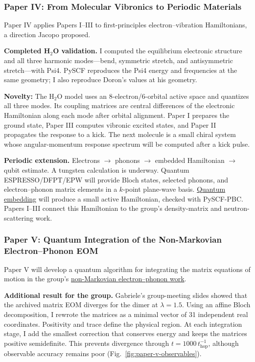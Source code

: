 \documentclass[11pt]{article}
\begin{document}
\subsubsection*{Paper IV: From Molecular Vibronics to Periodic Materials}
Paper IV applies Papers I--III to first-principles electron--vibration Hamiltonians, a direction Jacopo proposed.

\textbf{Completed H$_2$O validation.} I computed the equilibrium electronic structure and all three harmonic modes---bend, symmetric stretch, and antisymmetric stretch---with Psi4. PySCF reproduces the Psi4 energy and frequencies at the same geometry; I also reproduce Doron's values at his geometry.

\textbf{Novelty:} The H$_2$O model uses an 8-electron/6-orbital active space and quantizes all three modes. Its coupling matrices are central differences of the electronic Hamiltonian along each mode after orbital alignment. Paper I prepares the ground state, Paper III computes vibronic excited states, and Paper II propagates the response to a kick. The next molecule is a small chiral system whose angular-momentum response spectrum will be computed after a kick pulse.

\textbf{Periodic extension.} Electrons \(\rightarrow\) phonons \(\rightarrow\) embedded Hamiltonian \(\rightarrow\) qubit estimate. A tungsten calculation is underway. Quantum ESPRESSO/DFPT/EPW will provide Bloch states, selected phonons, and electron--phonon matrix elements in a \(k\)-point plane-wave basis. \href{https://doi.org/10.1038/s41524-020-00353-z}{Quantum embedding} will produce a small active Hamiltonian, checked with PySCF-PBC. Papers I--III connect this Hamiltonian to the group's density-matrix and neutron-scattering work.

\clearpage
\subsubsection*{Paper V: Quantum Integration of the Non-Markovian Electron--Phonon EOM}
Paper V will develop a quantum algorithm for integrating the matrix equations of motion in the group's \href{https://arxiv.org/abs/2606.22233}{non-Markovian electron--phonon work}.

\textbf{Additional result for the group.} Gabriele's group-meeting slides showed that the archived matrix EOM diverges for the dimer at \(\lambda=1.5\). Using an affine Bloch decomposition, I rewrote the matrices as a minimal vector of 31 independent real coordinates. Positivity and trace define the physical region. At each integration stage, I add the smallest correction that conserves energy and keeps the matrices positive semidefinite. This prevents divergence through \(t=1000\,t_{\mathrm{hop}}^{-1}\), although observable accuracy remains poor (Fig.~\ref{fig:paper-v-observables}).
\end{document}
